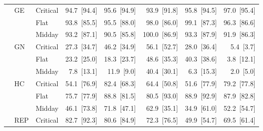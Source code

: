 \begin{tabular}{l l l r r r r r}
 & GE & Critical & 94.7~{\color{seasoncol}\scriptsize[94.4]} & 95.6~{\color{seasoncol}\scriptsize[94.9]} & 93.9~{\color{seasoncol}\scriptsize[91.8]} & 95.8~{\color{seasoncol}\scriptsize[94.5]} & 97.0~{\color{seasoncol}\scriptsize[95.4]} \\
 &  & Flat & 93.8~{\color{seasoncol}\scriptsize[85.5]} & 95.5~{\color{seasoncol}\scriptsize[88.0]} & 98.0~{\color{seasoncol}\scriptsize[86.0]} & 99.1~{\color{seasoncol}\scriptsize[87.3]} & 96.3~{\color{seasoncol}\scriptsize[86.6]} \\
 &  & Midday & 93.2~{\color{seasoncol}\scriptsize[87.1]} & 90.5~{\color{seasoncol}\scriptsize[85.8]} & 100.0~{\color{seasoncol}\scriptsize[86.9]} & 93.3~{\color{seasoncol}\scriptsize[87.9]} & 91.9~{\color{seasoncol}\scriptsize[86.3]} \\
 & GN & Critical & 27.3~{\color{seasoncol}\scriptsize[34.7]} & 46.2~{\color{seasoncol}\scriptsize[34.9]} & 56.1~{\color{seasoncol}\scriptsize[52.7]} & 28.0~{\color{seasoncol}\scriptsize[36.4]} & 5.4~{\color{seasoncol}\scriptsize[3.7]} \\
 &  & Flat & 23.2~{\color{seasoncol}\scriptsize[25.0]} & 18.3~{\color{seasoncol}\scriptsize[23.7]} & 48.6~{\color{seasoncol}\scriptsize[35.3]} & 40.3~{\color{seasoncol}\scriptsize[38.6]} & 3.8~{\color{seasoncol}\scriptsize[12.1]} \\
 &  & Midday & 7.8~{\color{seasoncol}\scriptsize[13.1]} & 11.9~{\color{seasoncol}\scriptsize[9.0]} & 40.4~{\color{seasoncol}\scriptsize[30.1]} & 6.3~{\color{seasoncol}\scriptsize[15.3]} & 2.0~{\color{seasoncol}\scriptsize[5.0]} \\
 & HC & Critical & 54.1~{\color{seasoncol}\scriptsize[76.9]} & 82.4~{\color{seasoncol}\scriptsize[68.3]} & 64.4~{\color{seasoncol}\scriptsize[50.8]} & 51.6~{\color{seasoncol}\scriptsize[77.9]} & 79.2~{\color{seasoncol}\scriptsize[77.8]} \\
 &  & Flat & 75.7~{\color{seasoncol}\scriptsize[77.9]} & 88.8~{\color{seasoncol}\scriptsize[81.5]} & 80.5~{\color{seasoncol}\scriptsize[93.0]} & 88.9~{\color{seasoncol}\scriptsize[92.9]} & 87.9~{\color{seasoncol}\scriptsize[82.8]} \\
 &  & Midday & 46.1~{\color{seasoncol}\scriptsize[73.8]} & 71.8~{\color{seasoncol}\scriptsize[47.1]} & 62.9~{\color{seasoncol}\scriptsize[35.1]} & 34.9~{\color{seasoncol}\scriptsize[61.0]} & 52.2~{\color{seasoncol}\scriptsize[54.7]} \\
 & REP & Critical & 82.7~{\color{seasoncol}\scriptsize[92.3]} & 80.6~{\color{seasoncol}\scriptsize[84.9]} & 72.3~{\color{seasoncol}\scriptsize[76.5]} & 49.9~{\color{seasoncol}\scriptsize[54.7]} & 69.5~{\color{seasoncol}\scriptsize[61.4]} \\

\end{tabular}
